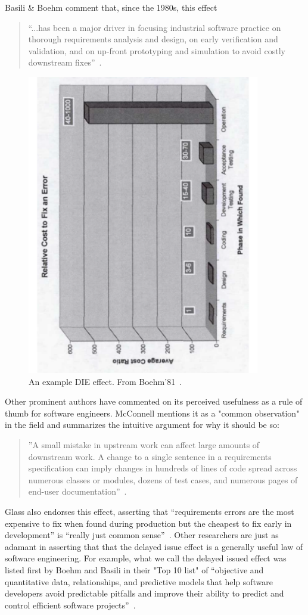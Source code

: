 \documentclass[smallcondensed]{svjour3}
\begin{document}
 Basili \& Boehm comment that, since the 1980s,  this effect
 \begin{quote}
``...has been a major driver in focusing
industrial software practice on thorough
requirements analysis and design,
on early verification and validation, and
on up-front prototyping and simulation
to avoid costly downstream fixes''~\cite{boehm01}.
\end{quote}
 \begin{figure}[!b]  
\begin{center}
\includegraphics[angle=270,width=4in]{img/b81.pdf}
 \end{center}
 \caption{An example DIE effect. From Boehm'81~\cite{Boehm81}. }\label{fig:b81}
 \end{figure}
Other prominent authors have commented on its perceived usefulness as a rule of thumb for software engineers.  McConnell mentions it as a "common observation" in the field and  summarizes the intuitive argument for why it should be so: 
\begin{quote}
''A small mistake in upstream work can affect large amounts of downstream work. A change to a single sentence in a requirements specification can imply changes in hundreds of lines of code spread across numerous classes or modules, dozens of test cases, and numerous pages of end-user documentation''~\cite{mcconnell01}. 
\end{quote}
Glass also endorses this effect, asserting that ``requirements errors are the most expensive to fix when found during production but the cheapest to fix early in development'' is ``really just common sense''~\cite{glass02}.  Other researchers
are just as adamant in asserting that that the delayed issue effect is a generally useful law of software engineering.
For example, what we call the delayed issued effect was listed first by Boehm and Basili in their "Top 10 list" of ``objective and quantitative data, relationships,
and predictive models that help
software developers avoid predictable pitfalls
and improve their ability to predict
and control efficient software projects''~\cite{boehm01}.
  
\end{document}
